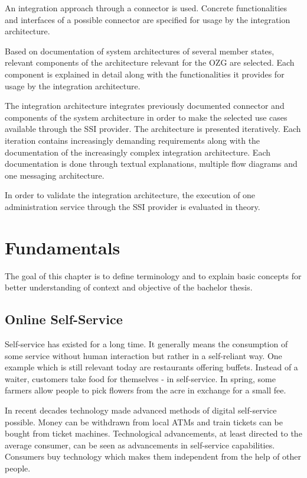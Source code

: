 \documentclass[
     12pt,         %
     a4paper,      %
     BCOR=10mm,version=first,     %
     DIV=14,version=first,        %
     ]{scrreprt}
\begin{document}
An integration approach through a connector is used. Concrete functionalities and interfaces of a possible connector are specified for usage by the integration architecture.

Based on documentation of system architectures of several member states, relevant components of the architecture relevant for the OZG are selected. Each component is explained in detail along with the functionalities it provides for usage by the integration architecture.

The integration architecture integrates previously documented connector and components of the system architecture in order to make the selected use cases available through the SSI provider. The architecture is presented iteratively. Each iteration contains increasingly demanding requirements along with the documentation of the increasingly complex integration architecture. Each documentation is done through textual explanations, multiple flow diagrams and one messaging architecture.

In order to validate the integration architecture, the execution of one administration service through the SSI provider is evaluated in theory.

\chapter{Fundamentals}
The goal of this chapter is to define terminology and to explain basic concepts for better understanding of context and objective of the bachelor thesis.


\section{Online Self-Service}
Self-service has existed for a long time. It generally means the consumption of some service without human interaction but rather in a self-reliant way. One example which is still relevant today are restaurants offering buffets. Instead of a waiter, customers take food for themselves - in self-service. In spring, some farmers allow people to pick flowers from the acre in exchange for a small fee.

In recent decades technology made advanced methods of digital self-service possible. Money can be withdrawn from local ATMs and train tickets can be bought from ticket machines. Technological advancements, at least directed to the average consumer, can be seen as advancements in self-service capabilities. Consumers buy technology which makes them independent from the help of other people. 
\end{document}

